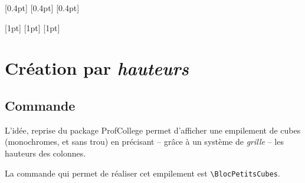 \documentclass[french,a4paper,11pt]{article}
\begin{document}
\begin{PresCode}{}
\begin{EmpilementCubes}
\end{EmpilementCubes}
\end{PresCode}

\begin{PresCode}{}
\begin{EmpilementCubes}
	[0.4pt]
	\PlaqueVide[2]
	[0.4pt]
	\PlaqueVide[2]
	[0.4pt]
\end{EmpilementCubes}
\end{PresCode}

\begin{PresCode}{}
\begin{EmpilementCubes}
\end{EmpilementCubes}
\end{PresCode}


\begin{PresCode}{}
\begin{EmpilementCubes}[1.75]
	[1pt]
	[1pt]
	[1pt]
\end{EmpilementCubes}
\end{PresCode}

\pagebreak

\section{Création par \textit{hauteurs}}

\subsection{Commande}

\begin{tipblock}
L'idée, reprise du package \textsf{ProfCollege}\footnotemark{} permet d'afficher une empilement de cubes (monochromes, et sans trou) en précisant -- grâce à un système de \textit{grille} -- les hauteurs des colonnes.

La commande qui permet de réaliser cet empilement est \texttt{\textbackslash BlocPetitsCubes}.
\end{tipblock}
\end{document}
